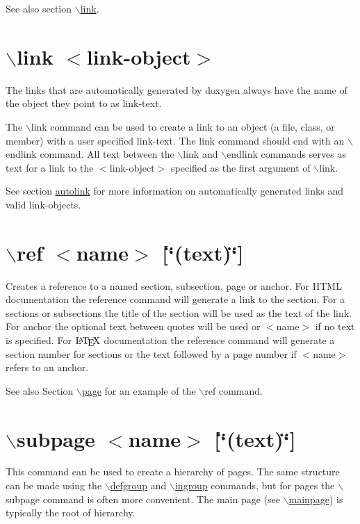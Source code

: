\begin{DoxySeeAlso}{See also}
section \hyperlink{commands_cmdlink}{$\backslash$link}.
\end{DoxySeeAlso}


 \hypertarget{commands_cmdlink}{}\section{$\backslash$link $<$link-\/object$>$}\label{commands_cmdlink}
 The links that are automatically generated by doxygen always have the name of the object they point to as link-\/text.

The $\backslash$link command can be used to create a link to an object (a file, class, or member) with a user specified link-\/text. The link command should end with an $\backslash$endlink command. All text between the $\backslash$link and $\backslash$endlink commands serves as text for a link to the $<$link-\/object$>$ specified as the first argument of $\backslash$link.

See section \hyperlink{autolink}{autolink} for more information on automatically generated links and valid link-\/objects.



 \hypertarget{commands_cmdref}{}\section{$\backslash$ref $<$name$>$ \mbox{[}\char`\"{}(text)\char`\"{}\mbox{]}}\label{commands_cmdref}
 Creates a reference to a named section, subsection, page or anchor. For HTML documentation the reference command will generate a link to the section. For a sections or subsections the title of the section will be used as the text of the link. For anchor the optional text between quotes will be used or $<$name$>$ if no text is specified. For $\mbox{\LaTeX}$ documentation the reference command will generate a section number for sections or the text followed by a page number if $<$name$>$ refers to an anchor.

\begin{DoxySeeAlso}{See also}
Section \hyperlink{commands_cmdpage}{$\backslash$page} for an example of the $\backslash$ref command.
\end{DoxySeeAlso}


 \hypertarget{commands_cmdsubpage}{}\section{$\backslash$subpage $<$name$>$ \mbox{[}\char`\"{}(text)\char`\"{}\mbox{]}}\label{commands_cmdsubpage}
 This command can be used to create a hierarchy of pages. The same structure can be made using the \hyperlink{commands_cmddefgroup}{$\backslash$defgroup} and \hyperlink{commands_cmdingroup}{$\backslash$ingroup} commands, but for pages the $\backslash$subpage command is often more convenient. The main page (see \hyperlink{commands_cmdmainpage}{$\backslash$mainpage}) is typically the root of hierarchy.

